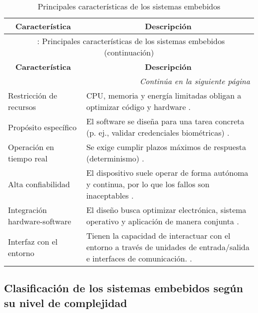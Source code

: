 \begin{longtable}{l|p{10cm}}
    \caption{Principales características de los sistemas embebidos} \label{tab:embedded_characteristics} \\
    \hline
    \multicolumn{1}{c|}{\textbf{Característica}} & \multicolumn{1}{c}{\textbf{Descripción}} \\
    \hline
    \endfirsthead
    
    \multicolumn{2}{c}{\tablename\ \thetable{}: Principales características de los sistemas embebidos (continuación)} \\
    \hline
    \multicolumn{1}{c|}{\textbf{Característica}} & \multicolumn{1}{c}{\textbf{Descripción}} \\
    \hline
    \endhead
    
    \hline
    \multicolumn{2}{r}{\textit{Continúa en la siguiente página}} \\
    \endfoot
    
    \hline
    \endlastfoot
    
    Restricción de recursos & CPU, memoria y energía limitadas obligan a optimizar código y hardware \cite{henriksson_2006}.\\
    \hline

    Propósito  específico & El software se diseña para una tarea concreta (p. ej., validar credenciales biométricas) \cite{wolf_embedded_2012}.\\
    \hline

    Operación en tiempo real & Se exige cumplir plazos máximos de respuesta (determinismo) \cite{shyamasundar_validating_2001}.\\
    \hline

    Alta confiabilidad & El dispositivo suele operar de forma autónoma y continua, por lo que los fallos son inaceptables \cite{windriver_embedded_security}.\\
    \hline

    Integración hardware-software & El diseño busca optimizar electrónica, sistema operativo y aplicación de manera conjunta \cite{wolf_embedded_2012}.\\
    \hline

    Interfaz con el entorno & Tienen la capacidad de interactuar con el entorno a través de unidades de entrada/salida e interfaces de comunicación. \cite{wolf_embedded_2012}.\\


\end{longtable}


\subsection{Clasificación de los sistemas embebidos según su nivel de complejidad}

